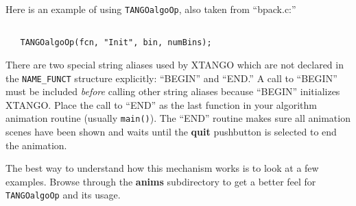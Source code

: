 Here is an example of using {\tt TANGOalgoOp}, also taken from ``bpack.c:''
\begin{tt}
\begin{verbatim}

   TANGOalgoOp(fcn, "Init", bin, numBins);

\end{verbatim}
\end{tt}

There are two special string aliases used by XTANGO which are not declared in
the {\tt NAME\_FUNCT} structure explicitly: ``BEGIN'' and ``END.''  A call to
``BEGIN'' must be included {\em before} calling other string aliases because
``BEGIN'' initializes XTANGO.  Place the call to ``END'' as the last function
in your algorithm animation routine (usually {\tt main()}).  The ``END'' routine
makes sure all animation scenes have been shown and waits until the {\bf quit}
pushbutton is selected to end the animation.

The best way to understand how this mechanism works is to look at a few
examples.  Browse through the {\bf anims} subdirectory to get a better feel
for {\tt TANGOalgoOp} and its usage.


